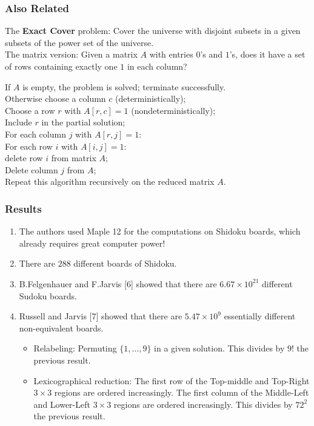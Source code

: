 \documentclass{beamer}
\newcommand\tab[1][1cm]{\hspace*{#1}}
\begin{document}
\begin{frame}
\frametitle{Also Related}
The \textbf{Exact Cover} problem: Cover the universe with disjoint subsets in a given subsets of the power set of the universe.\\

The matrix version: Given a matrix $A$ with entries $0$'s and $1$'s, does it have a set of rows containing exactly one $1$ in each column?

\begin{Theorem}
If $A$ is empty, the problem is solved; terminate successfully.\\
Otherwise choose a column $c$ (deterministically);\\
Choose a row $r$ with $A[r,c] = 1$ (nondeterministically);\\
Include $r$ in the partial solution;\\
For each column $j$ with $A[r,j] = 1$:\\ 
\tab For each row $i$ with $A[i,j] = 1:$\\
\tab \tab delete row $i$ from matrix $A$;\\
\tab Delete column $j$ from $A$;\\
Repeat this algorithm recursively on the reduced matrix $A$. 
\end{Theorem}
\end{frame}

\begin{frame}
\frametitle{Results}

\begin{enumerate}
\item The authors used Maple 12 for the computations on Shidoku boards, which already requires great computer power! 

\item There are $288$ different boards of Shidoku.

\item B.Felgenhauer and F.Jarvis [6] showed that there are $6.67 \times 10^{21}$ different Sudoku boards.


\item Russell and Jarvis [7] showed that there are $5.47 \times 10^9$ essentially different non-equivalent boards. 
\begin{itemize}
\item Relabeling: Permuting $\{1,\ldots, 9\}$ in a given solution. This divides by $9!$ the previous result. 
\item Lexicographical reduction: The first row of the Top-middle and Top-Right $3 \times 3$ regions are ordered increasingly. The first column of the Middle-Left and Lower-Left $3\times 3$ regions are ordered increasingly. This divides by $72^2$ the previous result. 
\end{itemize}
\end{enumerate}
\end{frame}
\end{document}
